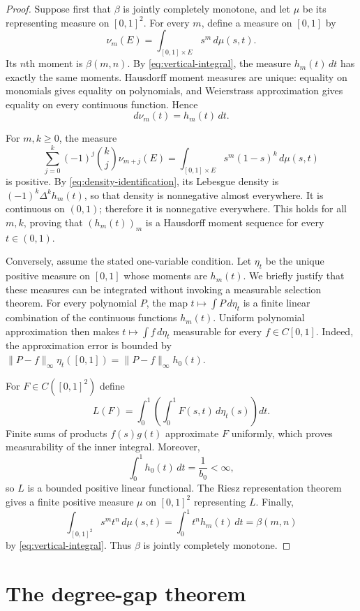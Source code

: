 \documentclass[11pt]{article}
\newcommand{\D}{\Delta}
\begin{document}
\begin{proof}
Suppose first that $\beta$ is jointly completely monotone, and let $\mu$ be
its representing measure on $[0,1]^2$.  For every $m$, define a measure on
$[0,1]$ by
\[
 \nu_m(E)=\int_{[0,1]\times E}s^m\,d\mu(s,t).
\]
Its $n$th moment is $\beta(m,n)$.  By \eqref{eq:vertical-integral}, the
measure $h_m(t)\,dt$ has exactly the same moments.  Hausdorff moment measures
are unique: equality on monomials gives equality on polynomials, and
Weierstrass approximation gives equality on every continuous function.
Hence
\begin{equation}\label{eq:density-identification}
 d\nu_m(t)=h_m(t)\,dt.
\end{equation}

For $m,k\ge0$, the measure
\[
 \sum_{j=0}^k(-1)^j\binom{k}{j}\nu_{m+j}(E)
 =\int_{[0,1]\times E}s^m(1-s)^k\,d\mu(s,t)
\]
is positive.  By \eqref{eq:density-identification}, its Lebesgue density is
$(-1)^k\D^kh_m(t)$, so that density is nonnegative almost everywhere.  It is
continuous on $(0,1)$; therefore it is nonnegative everywhere.  This holds
for all $m,k$, proving that $(h_m(t))_m$ is a Hausdorff moment sequence for
every $t\in(0,1)$.

Conversely, assume the stated one-variable condition.  Let $\eta_t$ be the
unique positive measure on $[0,1]$ whose moments are $h_m(t)$.  We briefly
justify that these measures can be integrated without invoking a measurable
selection theorem.  For every polynomial $P$, the map
$t\mapsto\int P\,d\eta_t$ is a finite linear combination of the continuous
functions $h_m(t)$.  Uniform polynomial approximation then makes
$t\mapsto\int f\,d\eta_t$ measurable for every $f\in C[0,1]$.  Indeed, the
approximation error is bounded by
$\lVert P-f\rVert_\infty\eta_t([0,1])
=\lVert P-f\rVert_\infty h_0(t)$.

For $F\in C([0,1]^2)$ define
\[
 L(F)=\int_0^1\left(\int_0^1F(s,t)\,d\eta_t(s)\right)dt.
\]
Finite sums of products $f(s)g(t)$ approximate $F$ uniformly, which proves
measurability of the inner integral.  Moreover,
\[
 \int_0^1h_0(t)\,dt=\frac1{b_0}<\infty,
\]
so $L$ is a bounded positive linear functional.  The Riesz representation
theorem gives a finite positive measure $\mu$ on $[0,1]^2$ representing $L$.
Finally,
\[
 \int_{[0,1]^2}s^mt^n\,d\mu(s,t)
 =\int_0^1t^nh_m(t)\,dt
 =\beta(m,n)
\]
by \eqref{eq:vertical-integral}.  Thus $\beta$ is jointly completely
monotone.
\end{proof}

\section{The degree-gap theorem}
\end{document}
